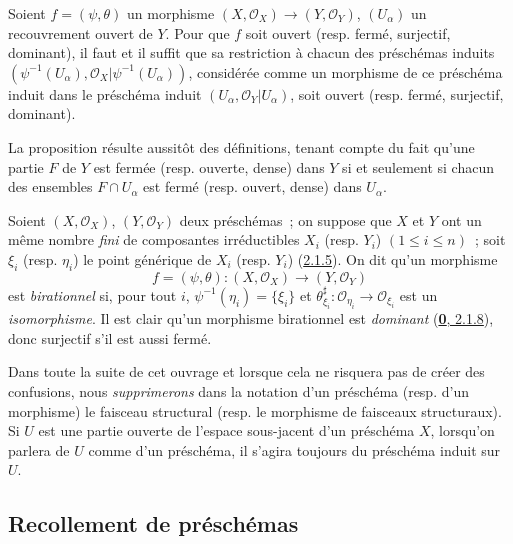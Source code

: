\begin{proposition}[2.2.8]
\label{I.2.2.8-fr}
Soient $f=(\psi,\theta)$ un morphisme
$(X,\mathscr{O}_X)\to(Y,\mathscr{O}_Y)$, $(U_\alpha)$ un recouvrement ouvert
de $Y$. Pour que $f$ soit ouvert \textup{(resp.} fermé, surjectif, dominant), il faut
et il suffit que sa restriction à chacun des préschémas induits
$(\psi^{-1}(U_\alpha),\mathscr{O}_X|\psi^{-1}(U_\alpha))$, considérée comme
un morphisme de ce préschéma induit dans le préschéma induit
$(U_\alpha,\mathscr{O}_Y|U_\alpha)$, soit ouvert \textup{(resp.} fermé, surjectif,
dominant).
\end{proposition}

La proposition résulte aussitôt des définitions, tenant compte du fait qu'une
partie $F$ de $Y$ est fermée (resp. ouverte, dense) dans $Y$ si et seulement
si chacun des ensembles $F\cap U_\alpha$ est fermé (resp. ouvert, dense) dans
$U_\alpha$.

\begin{env}[2.2.9]
\label{I.2.2.9-fr}
Soient $(X,\mathscr{O}_X)$, $(Y,\mathscr{O}_Y)$ deux préschémas~; on suppose
que $X$ et $Y$ ont un même nombre \emph{fini} de composantes irréductibles
$X_i$ (resp. $Y_i$) $(1\leq i\leq n)$~; soit $\xi_i$ (resp. $\eta_i$) le
point générique de $X_i$ (resp. $Y_i$)
(\hyperref[I.2.1.5-fr]{2.1.5}). On dit qu'un morphisme
\[
  f=(\psi,\theta):(X,\mathscr{O}_X)\to(Y,\mathscr{O}_Y)
\]
est \emph{birationnel} si, pour tout $i$, $\psi^{-1}(\eta_i)=\{\xi_i\}$ et
$\theta_{\xi_i}^{\sharp}:\mathscr{O}_{\eta_i}\to\mathscr{O}_{\xi_i}$ est un
\emph{isomorphisme}. Il est clair qu'un morphisme birationnel est
\emph{dominant} (\hyperref[0.2.1.8-fr]{\textbf{0}, 2.1.8}), donc surjectif s'il est
aussi fermé.
\end{env}

\begin{notation}[2.2.10]
\label{I.2.2.10-fr}
Dans toute la suite de cet ouvrage et lorsque cela ne risquera pas de créer
des confusions, nous \emph{supprimerons} dans la notation d'un préschéma
(resp. d'un morphisme) le faisceau structural (resp. le morphisme de faisceaux
structuraux). Si $U$ est une partie ouverte de l'espace sous-jacent d'un
préschéma $X$, lorsqu'on parlera de $U$ comme d'un préschéma, il s'agira
toujours du préschéma induit sur $U$.
\end{notation}

\subsection{Recollement de préschémas}
\label{subsection:I.2.3-fr}

